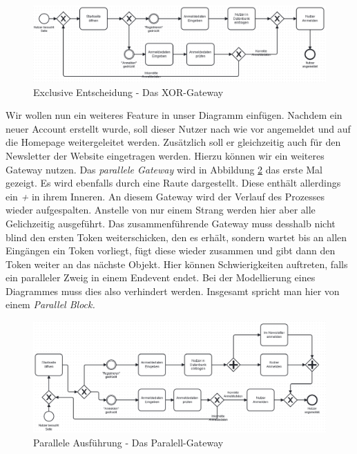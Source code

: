 \begin{figure}
\centering
\includegraphics[scale=0.5]{Figures/Beispiel5}
\decoRule
\caption[XOR-Gateway]{Exclusive Entscheidung - Das XOR-Gateway}
\label{XOR}
\end{figure}Wir wollen nun ein weiteres Feature in unser Diagramm einfügen. Nachdem ein neuer Account erstellt wurde, soll dieser Nutzer nach wie vor angemeldet und auf die Homepage weitergeleitet werden. Zusätzlich soll er gleichzeitig auch für den Newsletter der Website eingetragen werden. Hierzu können wir ein weiteres Gateway nutzen. Das \textit{parallele Gateway} wird in Abbildung \ref{parallel} das erste Mal gezeigt. Es wird ebenfalls durch eine Raute dargestellt. Diese enthält allerdings ein \textit{+} in ihrem Inneren. An diesem Gateway wird der Verlauf des Prozesses wieder aufgespalten. Anstelle von nur einem Strang werden hier aber alle Gelichzeitig ausgeführt. Das zusammenführende Gateway muss desshalb nicht blind den ersten Token weiterschicken, den es erhält, sondern wartet bis an allen Eingängen ein Token vorliegt, fügt diese wieder zusammen und gibt dann den Token weiter an das nächste Objekt. Hier können Schwierigkeiten auftreten, falls ein paralleler Zweig in einem Endevent endet. Bei der Modellierung eines Diagrammes muss dies also verhindert werden. Insgesamt spricht man hier von einem \textit{Parallel Block.}\\
\begin{figure}
\centering
\includegraphics[scale=0.5]{Figures/Beispiel6}
\decoRule
\caption[Paralell-Gateway]{Parallele Ausführung - Das Paralell-Gateway}
\label{parallel}
\end{figure}
